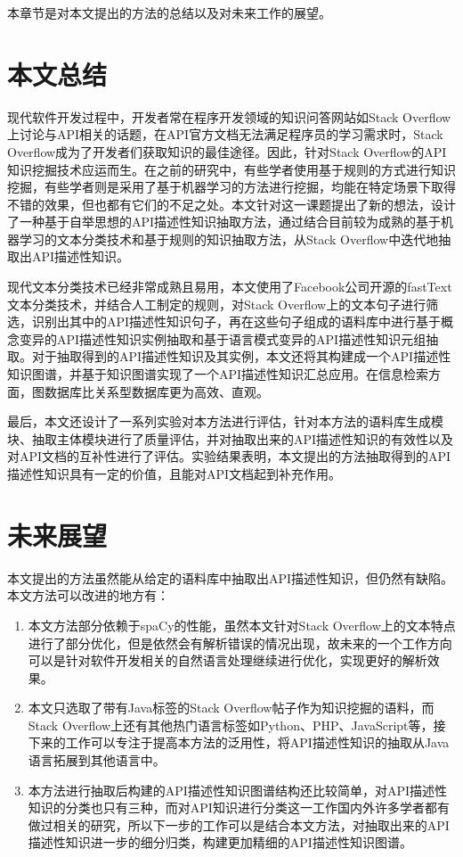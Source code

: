本章节是对本文提出的方法的总结以及对未来工作的展望。
\section{本文总结}
现代软件开发过程中，开发者常在程序开发领域的知识问答网站如Stack Overflow上讨论与API相关的话题，在API官方文档无法满足程序员的学习需求时，Stack Overflow成为了开发者们获取知识的最佳途径。因此，针对Stack Overflow的API知识挖掘技术应运而生。在之前的研究中，有些学者使用基于规则的方式进行知识挖掘，有些学者则是采用了基于机器学习的方法进行挖掘，均能在特定场景下取得不错的效果，但也都有它们的不足之处。本文针对这一课题提出了新的想法，设计了一种基于自举思想的API描述性知识抽取方法，通过结合目前较为成熟的基于机器学习的文本分类技术和基于规则的知识抽取方法，从Stack Overflow中迭代地抽取出API描述性知识。

现代文本分类技术已经非常成熟且易用，本文使用了Facebook公司开源的fastText文本分类技术，并结合人工制定的规则，对Stack Overflow上的文本句子进行筛选，识别出其中的API描述性知识句子，再在这些句子组成的语料库中进行基于概念变异的API描述性知识实例抽取和基于语言模式变异的API描述性知识元组抽取。对于抽取得到的API描述性知识及其实例，本文还将其构建成一个API描述性知识图谱，并基于知识图谱实现了一个API描述性知识汇总应用。在信息检索方面，图数据库比关系型数据库更为高效、直观。

最后，本文还设计了一系列实验对本方法进行评估，针对本方法的语料库生成模块、抽取主体模块进行了质量评估，并对抽取出来的API描述性知识的有效性以及对API文档的互补性进行了评估。实验结果表明，本文提出的方法抽取得到的API描述性知识具有一定的价值，且能对API文档起到补充作用。
\section{未来展望}
本文提出的方法虽然能从给定的语料库中抽取出API描述性知识，但仍然有缺陷。本文方法可以改进的地方有：
\begin{enumerate}
    \item 本文方法部分依赖于spaCy的性能，虽然本文针对Stack Overflow上的文本特点进行了部分优化，但是依然会有解析错误的情况出现，故未来的一个工作方向可以是针对软件开发相关的自然语言处理继续进行优化，实现更好的解析效果。
    \item 本文只选取了带有Java标签的Stack Overflow帖子作为知识挖掘的语料，而Stack Overflow上还有其他热门语言标签如Python、PHP、JavaScript等，接下来的工作可以专注于提高本方法的泛用性，将API描述性知识的抽取从Java语言拓展到其他语言中。
    \item 本方法进行抽取后构建的API描述性知识图谱结构还比较简单，对API描述性知识的分类也只有三种，而对API知识进行分类这一工作国内外许多学者都有做过相关的研究，所以下一步的工作可以是结合本文方法，对抽取出来的API描述性知识进一步的细分归类，构建更加精细的API描述性知识图谱。
\end{enumerate}